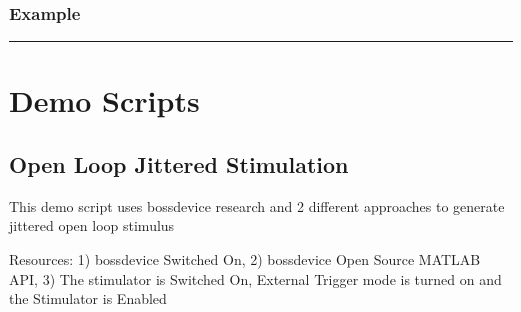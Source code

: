\documentclass[letterpaper,10pt,english]{sphinxmanual}
\begin{document}
\subsection{Example}
\label{\detokenize{4_api_documentation:id50}}
\begin{sphinxVerbatim}[commandchars=\\\{\}]
   
\end{sphinxVerbatim}


\bigskip\hrule\bigskip



\chapter{Demo Scripts}
\label{\detokenize{5_demo_scripts:demo-scripts}}\label{\detokenize{5_demo_scripts::doc}}

\section{Open Loop Jittered Stimulation}
\label{\detokenize{5_demo_scripts:open-loop-jittered-stimulation}}
This demo script uses bossdevice research and 2 different approaches to generate jittered open loop stimulus

Resources: 1) bossdevice Switched On, 2) bossdevice Open Source MATLAB API, 3) The stimulator is Switched On, External Trigger mode is turned on and the Stimulator is Enabled
\end{document}
